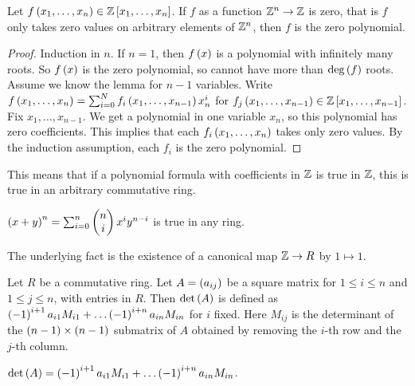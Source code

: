 \begin{lemma}
Let $ f\left( x_1, \dots, x_n \right) \in \mathbb{Z}\left[ x_1, \dots, x_n \right] $. If $ f $ as a function $ \mathbb{Z}^n \to \mathbb{Z} $ is zero, that is $ f $ only takes zero values on arbitrary elements of $ \mathbb{Z}^n $, then $ f $ is the zero polynomial.
\end{lemma}

\begin{proof}
Induction in $ n $. If $ n = 1 $, then $ f\left( x \right) $ is a polynomial with infinitely many roots. So $ f\left( x \right) $ is the zero polynomial, so cannot have more than $ \deg\left( f \right) $ roots. Assume we know the lemma for $ n - 1 $ variables. Write $ f\left( x_1, \dots, x_n \right) = \sum_{i = 0}^N f_i\left( x_1, \dots, x_{n - 1} \right)x_n^i $ for $ f_j\left( x_1, \dots, x_{n - 1} \right) \in \mathbb{Z}\left[ x_1, \dots, x_{n - 1} \right] $. Fix $ x_1, \dots, x_{n - 1} $. We get a polynomial in one variable $ x_n $, so this polynomial has zero coefficients. This implies that each $ f_i\left( x_1, \dots, x_n \right) $ takes only zero values. By the induction assumption, each $ f_i $ is the zero polynomial.
\end{proof}

\begin{remark}
\label{rem:7.2}
This means that if a polynomial formula with coefficients in $ \mathbb{Z} $ is true in $ \mathbb{Z} $, this is true in an arbitrary commutative ring.
\end{remark}

\begin{example*}
$ \left( x + y \right)^n = \sum_{i = 0}^n \begin{pmatrix} n \\ i \end{pmatrix}x^iy^{n - i} $ is true in any ring.
\end{example*}

The underlying fact is the existence of a canonical map $ \mathbb{Z} \to R $ by $ 1 \mapsto 1 $.

\begin{definition}
Let $ R $ be a commutative ring. Let $ A = \left( a_{ij} \right) $ be a square matrix for $ 1 \le i \le n $ and $ 1 \le j \le n $, with entries in $ R $. Then $ \det\left( A \right) $ is defined as $ \left( -1 \right)^{i + 1}a_{i1}M_{i1} + \dots \left( -1 \right)^{i + n}a_{in}M_{in} $ for $ i $ fixed. Here $ M_{ij} $ is the determinant of the $ \left( n - 1 \right) \times \left( n - 1 \right) $ submatrix of $ A $ obtained by removing the $ i $-th row and the $ j $-th column.
\end{definition}

\begin{proposition}
$ \det\left( A \right) = \left( -1 \right)^{i + 1}a_{i1}M_{i1} + \dots \left( -1 \right)^{i + n}a_{in}M_{in} $.
\end{proposition}

